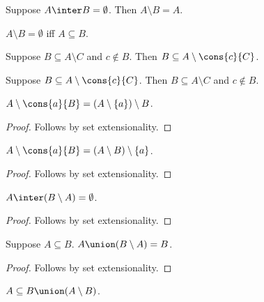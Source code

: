 \begin{proposition}\label{setminus_absorb_right}
    Suppose $A\inter B = \emptyset$.
    Then $A\setminus B = A$.
\end{proposition}

\begin{proposition}\label{setminus_eq_emptyset_iff_subseteq}
    $A\setminus B = \emptyset$ iff $A\subseteq B$.
\end{proposition}

\begin{proposition}\label{subseteq_setminus_cons_intro}
    Suppose $B\subseteq A\setminus C$ and $c\notin B$. Then $B\subseteq A\setminus\cons{c}{C}$.
\end{proposition}

\begin{proposition}\label{subseteq_setminus_cons_elim}
    Suppose $B\subseteq A\setminus\cons{c}{C}$. Then $B\subseteq A\setminus C$ and $c\notin B$.
\end{proposition}

\begin{proposition}\label{setminus_cons}
    $A\setminus \cons{a}{B} = (A\setminus \{a\})\setminus B$.
\end{proposition}
\begin{proof}
    Follows by set extensionality.
\end{proof}
\begin{proposition}\label{setminus_cons_flip}
    $A\setminus \cons{a}{B} = (A\setminus B)\setminus \{a\}$.
\end{proposition}
\begin{proof}
    Follows by set extensionality.
\end{proof}

\begin{proposition}\label{setminus_disjoint}
    $A\inter (B\setminus A) = \emptyset$.
\end{proposition}
\begin{proof}
    Follows by set extensionality.
\end{proof}

\begin{proposition}\label{setminus_partition}
    Suppose $A\subseteq B$.
    $A\union (B\setminus A) = B$.
\end{proposition}
\begin{proof}
    Follows by set extensionality.
\end{proof}

\begin{proposition}\label{subseteq_union_setminus}
    $A\subseteq B\union (A\setminus B)$.
\end{proposition}

